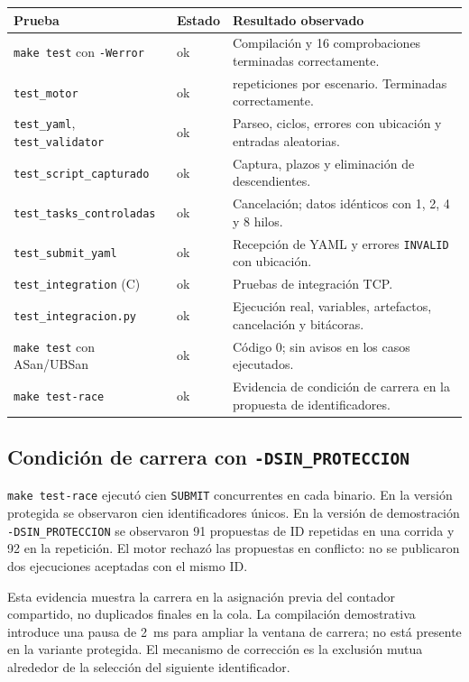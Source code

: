 \documentclass[12pt,a4paper]{article}
\newcommand{\code}[1]{\texttt{#1}}
\begin{document}
\begin{longtable}{@{}>{\raggedright\arraybackslash}p{4.6cm}>{\centering\arraybackslash}p{1.4cm}>{\raggedright\arraybackslash}p{9cm}@{}}
\toprule
\textbf{Prueba} & \textbf{Estado} & \textbf{Resultado observado} \\
\midrule
\endhead
\code{make test} con \code{-Werror} & ok & Compilación y 16 comprobaciones terminadas correctamente. \\[3pt]
\code{test\_motor} & ok & 200 repeticiones por escenario. Terminadas correctamente. \\[3pt]
\code{test\_yaml}, \code{test\_validator} & ok & Parseo, ciclos, errores con ubicación y entradas aleatorias. \\[3pt]
\code{test\_script\_capturado} & ok & Captura, plazos y eliminación de descendientes. \\[3pt]
\code{test\_tasks\_controladas} & ok & Cancelación; datos idénticos con 1, 2, 4 y 8 hilos. \\[3pt]
\code{test\_submit\_yaml} & ok & Recepción de YAML y errores \code{INVALID} con ubicación. \\[3pt]
\code{test\_integration} (C) & ok & Pruebas de integración TCP. \\[3pt]
\code{test\_integracion.py} & ok & Ejecución real, variables, artefactos, cancelación y bitácoras. \\[3pt]
\code{make test} con ASan/UBSan & ok & Código 0; sin avisos en los casos ejecutados. \\[3pt]
\code{make test-race} & ok & Evidencia de condición de carrera en la propuesta de identificadores. \\
\bottomrule
\end{longtable}

\subsection{Condición de carrera con \code{-DSIN\_PROTECCION}}

\code{make test-race} ejecutó cien \code{SUBMIT} concurrentes en cada binario. En la versión protegida se observaron cien identificadores únicos. En la versión de demostración \code{-DSIN\_PROTECCION} se observaron 91 propuestas de ID repetidas en una corrida y 92 en la repetición. El motor rechazó las propuestas en conflicto: no se publicaron dos ejecuciones aceptadas con el mismo ID.

Esta evidencia muestra la carrera en la asignación previa del contador compartido, no duplicados finales en la cola. La compilación demostrativa introduce una pausa de 2~ms para ampliar la ventana de carrera; no está presente en la variante protegida. El mecanismo de corrección es la exclusión mutua alrededor de la selección del siguiente identificador.
\end{document}
